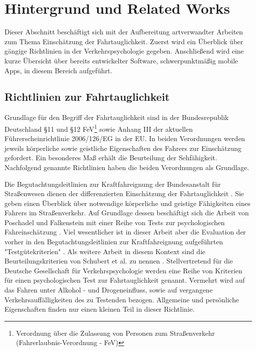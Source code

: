 \section{Hintergrund und Related Works}
\label{relatedWork}
Dieser Abschnitt beschäftigt sich mit der Aufbereitung artverwandter Arbeiten zum Thema Einschätzung der Fahrtauglichkeit. Zuerst wird ein Überblick über gängige Richtlinien in der Verkehrspsychologie gegeben. Anschließend wird eine kurze Übersicht über bereits entwickelter Software, schwerpunktmäßig mobile Apps, in diesem Bereich aufgeführt. 

\subsection{Richtlinien zur Fahrtauglichkeit} 

Grundlage für den Begriff der Fahrtauglichkeit sind in der Bundesrepublik Deutschland \S 11 und \S 12 FeV\footnote{\label{foot:fev}Verordnung über die Zulassung von Personen zum Straßenverkehr (Fahrerlaubnis-Verordnung - FeV)} sowie Anhang III der aktuellen Führerscheinrichtlinie 2006/126/EG in der EU. In beiden Verordnungen werden jeweils körperliche sowie geistliche Eigenschaften des Fahrers zur Einschätzung gefordert. Ein besonderes Maß erhält die Beurteilung der Sehfähigkeit. Nachfolgend genannte Richtlinien haben die beiden Verordnungen als Grundlage.

Die Begutachtungsleitlinien zur Kraftfahreignung der Bundesanstalt für Straßenwesen dienen der differenzierten Einschätzung der Fahrtauglichkeit \cite{begutachtungsrichtlinien}. Sie geben einen Überblick über notwendige körperliche und geistige Fähigkeiten eines Fahrers im Straßenverkehr.
Auf Grundlage dessen beschäftigt sich die Arbeit von Poschadel und Falkenstein mit einer Reihe von Tests zur psychologischen Fahreinschätzung \cite{testverfahrenpsychometrischefahreignung}. Viel wesentlicher ist in dieser Arbeit aber die Evaluation der vorher in den Begutachtungsleitlinien zur Kraftfahreignung aufgeführten "Testgütekriterien" \cite{begutachtungsrichtlinien}. Als weitere Arbeit in diesem Kontext sind die Beurteilungskriterien von Schubert et al. zu nennen \cite{beurteilungskriterien}. Stellvertretend für die Deutsche Gesellschaft für Verkehrspsychologie werden eine Reihe von Kriterien für einen psychologischen Test zur Fahrtauglichkeit genannt. Vermehrt wird  auf das Fahren unter Alkohol - und Drogeneinfluss, sowie auf vergangene Verkehrsauffälligkeiten des zu Testenden bezogen. Allgemeine und persönliche Eigenschaften finden nur einen kleinen Teil in dieser Richtlinie. 


